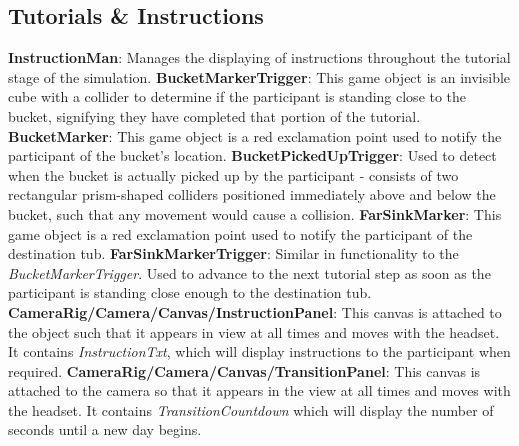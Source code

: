 \documentclass{article}
\begin{document}
\subsection*{Tutorials \& Instructions} 
\textbf{InstructionMan}: Manages the displaying of instructions throughout the tutorial stage of the simulation.\newline \newline
\textbf{BucketMarkerTrigger}: This game object is an invisible cube with a collider to determine if the participant is standing close to the bucket, signifying they have completed that portion of the tutorial.\newline \newline
\textbf{BucketMarker}: This game object is a red exclamation point used to notify the participant of the bucket's location.\newline \newline
\textbf{BucketPickedUpTrigger}: Used to detect when the bucket is actually picked up by the participant - consists of two rectangular prism-shaped colliders positioned immediately above and below the bucket, such that any movement would cause a collision.\newline \newline
\textbf{FarSinkMarker}: This game object is a red exclamation point used to notify the participant of the destination tub.\newline \newline
\textbf{FarSinkMarkerTrigger}: Similar in functionality to the \textit{BucketMarkerTrigger}. Used to advance to the next tutorial step as soon as the participant is standing close enough to the destination tub.\newline \newline
\textbf{CameraRig\slash Camera\slash Canvas\slash InstructionPanel}: This canvas is attached to the  object such that it appears in view at all times and moves with the headset. It contains \textit{InstructionTxt}, which will display instructions to the participant when required. \newline \newline
\textbf{CameraRig/Camera/Canvas/TransitionPanel}: This canvas is attached to the camera so that it appears in the view at all times and moves with the headset. It contains \textit{TransitionCountdown} which will display the number of seconds until a new day begins. 
\end{document}
